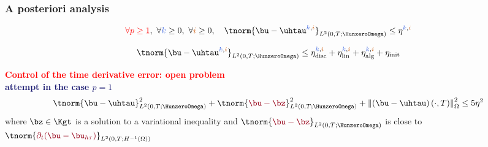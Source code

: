 \begin{frame}
\frametitle{A posteriori analysis}
\begin{theorem}
\begin{equation*}
\textcolor{red}{\forall p \geq 1}, \ \forall \kk \geq 0, \ \forall \ii \geq 0, \quad \tnorm{\bu-\uhtau^{\kk,\ii}}_{L^2(0,T;\HunzeroOmega)}  \leq \eta^{\kk,\ii}
\end{equation*}
\end{theorem}
\vspace{0.1 cm}
\begin{corollary}
\begin{equation*}
\tnorm{\bu-\uhtau^{\kk,\ii}}_{L^2(0,T;\HunzeroOmega)}  \leq \eta_{\mathrm{disc}}^{\kk,\ii} + \eta_{\mathrm{lin}}^{\kk,\ii} + \eta_{\mathrm{alg}}^{\kk,\ii} + \eta_{\mathrm{init}}
\end{equation*}
\end{corollary}
\textcolor{red}{\textbf{Control of the time derivative error: open problem}}
\\
\textcolor{midnightblue}{\textbf{attempt in the case $p=1$}}
\begin{equation*}
\tnorm{\bu-\uhtau}_{L^2(0,T;\HunzeroOmega)}^2 + \tnorm{\textcolor{carmine}{\bu-\bz}}_{L^2(0,T;\HunzeroOmega)}^2  + \left\|\left(\bu - \uhtau\right)(\cdot,T) \right\|_{\Omega}^2 \leq 5 \eta^2
\end{equation*}
where $\bz \in \Kgt$ is a solution to a variational inequality and 
$\tnorm{\textcolor{carmine}{\bu-\bz}}_{L^2(0,T;\HunzeroOmega)}$ is close to $\tnorm{\textcolor{carmine}{\partial_t(\bu-\bu_{h \tau})}}_{L^2(0,T;H^{-1}(\Omega))}$
\end{frame}
%


